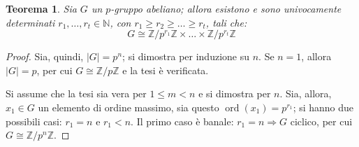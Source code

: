 \documentclass[11pt]{article}
\theoremstyle{style}
\newtheorem{teorema}{Teorema}[section]
\numberwithin{equation}{subsection}
\begin{document}
\begin{teorema}\label{corts2}
	Sia $G$ un $p$-gruppo abeliano; allora esistono e sono univocamente determinati $r_1,\ldots,r_t \in \mathbb{N}$, con $r_1\ge r_2\ge \ldots\ge r_t$, tali che:
	\[
	G \cong \mathbb{Z}/p^{r_1}\mathbb{Z} \times  \ldots \times \mathbb{Z} / p^{r_t}\mathbb{Z}
	\] 
\end{teorema}
	\begin{proof}
		Sia, quindi, $\lvert G \rvert =p^{n}$; si dimostra per induzione su $n$.
		Se $n=1$, allora $\lvert G \rvert = p$, per cui $G \cong \mathbb{Z} / p\mathbb{Z}$ e la tesi \`e verificata.

		Si assume che la tesi sia vera per $1 \le m < n $ e si dimostra per $n$. 
		Sia, allora, $x_1 \in G$ un elemento di ordine massimo, sia questo $\operatorname{ord}(x_1) =p^{r_1} $; si hanno due possibili casi: $r_1 = n$ e $r_1<n$.
		Il primo caso \`e banale: $r_1=n \Rightarrow G$ ciclico, per cui $G \cong \mathbb{Z}/p^n\mathbb{Z}$.


\end{proof}
\end{document}

